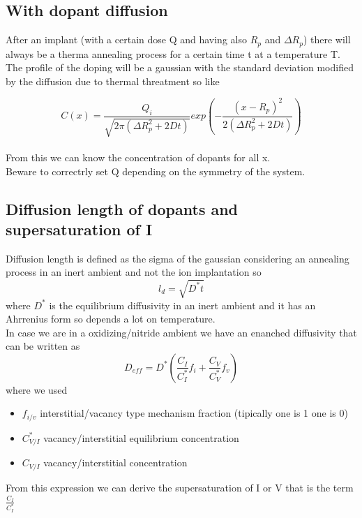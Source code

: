 
\subsection{With dopant diffusion}

After an implant (with a certain dose Q and having also $R_p$ and $\Delta R_p$) there will always be a therma annealing process for a certain time t at a temperature T.\\
The profile of the doping will be a gaussian with the standard deviation modified by the diffusion due to thermal threatment so like

\begin{equation}
C(x)=\frac{Q_i}{\sqrt{2\pi (\Delta R_p^2+2Dt)}}exp\left(-\frac{(x-R_p)^2}{2(\Delta R_p^2+2Dt)}\right)
\end{equation} 
\\
From this we can know the concentration of dopants for all x.\\
Beware to correctrly set Q depending on the symmetry of the system.\\

\subsection{Diffusion length of dopants and supersaturation of I}
Diffusion length is defined as the sigma of the gaussian considering an annealing process in an inert ambient and not the ion implantation so 
\begin{equation}
l_d=\sqrt{D^*t}
\end{equation}
where $D^*$ is the equilibrium diffusivity in an inert ambient and it has an Ahrrenius form so depends a lot on temperature.\\
In case we are in a oxidizing/nitride ambient we have an enanched diffusivity that can be written as
\begin{equation}
D_{eff}=D^*\left(\frac{C_I}{C_I^*}f_i+\frac{C_V}{C_V^*}f_v \right)
\end{equation}
where we used 
\begin{itemize}
\item $f_{i/v}$ interstitial/vacancy type mechanism fraction (tipically one is 1 one is 0)
\item $C_{V/I}^*$ vacancy/interstitial equilibrium concentration
\item $C_{V/I}$ vacancy/interstitial concentration
\end{itemize}
From this expression we can derive the supersaturation of I or V that is the term $\frac{C_I}{C_I^*}$

